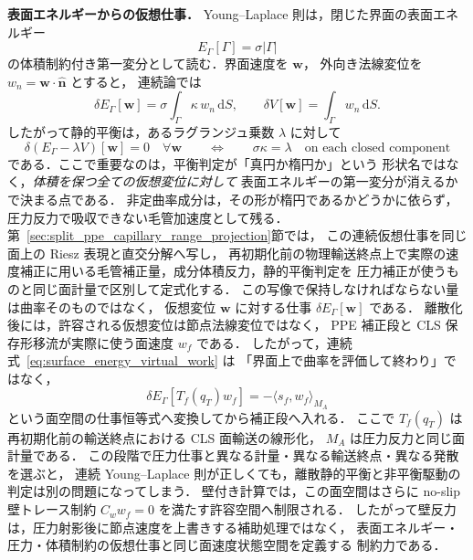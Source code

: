 \noindent\textbf{表面エネルギーからの仮想仕事．}
Young--Laplace 則は，閉じた界面の表面エネルギー
\begin{equation}
  E_\Gamma[\Gamma]=\sigma |\Gamma|
  \label{eq:surface_energy_functional}
\end{equation}
の体積制約付き第一変分として読む．界面速度を $\bm w$，
外向き法線変位を $w_n=\bm w\cdot\hat{\bm n}$ とすると，
連続論では
\begin{equation}
  \delta E_\Gamma[\bm w]
  =
  \sigma\int_\Gamma \kappa\,w_n\,\mathrm{d}S,
  \qquad
  \delta V[\bm w]
  =
  \int_\Gamma w_n\,\mathrm{d}S .
  \label{eq:surface_energy_virtual_work}
\end{equation}
したがって静的平衡は，あるラグランジュ乗数 $\lambda$ に対して
\begin{equation}
  \delta(E_\Gamma-\lambda V)[\bm w]=0
  \quad\forall \bm w
  \qquad\Longleftrightarrow\qquad
  \sigma\kappa=\lambda
  \quad\text{on each closed component}
  \label{eq:surface_energy_constrained_equilibrium}
\end{equation}
である．ここで重要なのは，平衡判定が「真円か楕円か」という
形状名ではなく，\emph{体積を保つ全ての仮想変位に対して}
表面エネルギーの第一変分が消えるかで決まる点である．
非定曲率成分は，その形が楕円であるかどうかに依らず，
圧力反力で吸収できない毛管加速度として残る．
第~\ref{sec:split_ppe_capillary_range_projection}節では，
この連続仮想仕事を同じ面上の Riesz 表現と直交分解へ写し，
再初期化前の物理輸送終点上で実際の速度補正に用いる毛管補正量，成分体積反力，静的平衡判定を
圧力補正が使うものと同じ面計量で区別して定式化する．
この写像で保持しなければならない量は曲率そのものではなく，
仮想変位 $\bm w$ に対する仕事 $\delta E_\Gamma[\bm w]$ である．
離散化後には，許容される仮想変位は節点法線変位ではなく，
PPE 補正段と CLS 保存形移流が実際に使う面速度 $w_f$ である．
したがって，連続式~\eqref{eq:surface_energy_virtual_work} は
「界面上で曲率を評価して終わり」ではなく，
\[
  \delta E_\Gamma[T_f(q_T)w_f]
  =
  -\langle s_f,w_f\rangle_{M_A}
\]
という面空間の仕事恒等式へ変換してから補正段へ入れる．
ここで $T_f(q_T)$ は再初期化前の輸送終点における CLS 面輸送の線形化，
$M_A$ は圧力反力と同じ面計量である．
この段階で圧力仕事と異なる計量・異なる輸送終点・異なる発散を選ぶと，
連続 Young--Laplace 則が正しくても，離散静的平衡と非平衡駆動の判定は別の問題になってしまう．
壁付き計算では，この面空間はさらに no-slip 壁トレース制約
$C_ww_f=0$ を満たす許容空間へ制限される．
したがって壁反力は，圧力射影後に節点速度を上書きする補助処理ではなく，
表面エネルギー・圧力・体積制約の仮想仕事と同じ面速度状態空間を定義する
制約力である．


